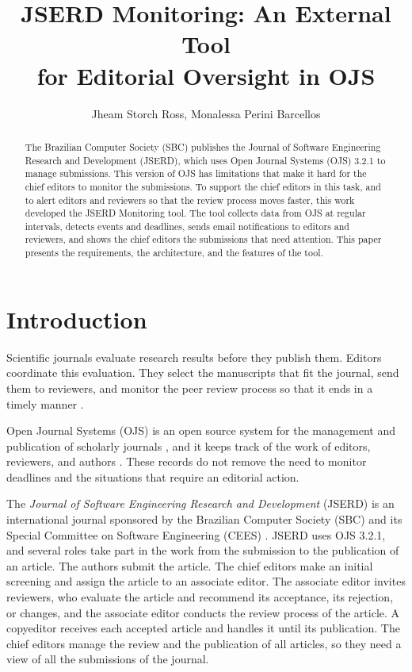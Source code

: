 \documentclass[12pt]{article}
\title{JSERD Monitoring: An External Tool\\for Editorial Oversight in OJS}
\author{Jheam Storch Ross\inst{1}, Monalessa Perini Barcellos\inst{1}}
\begin{document}
\maketitle

\begin{abstract}
The Brazilian Computer Society (SBC) publishes the Journal of Software
Engineering Research and Development (JSERD), which uses Open Journal Systems
(OJS) 3.2.1 to manage submissions. This version of OJS has limitations that make it hard
for the chief editors to monitor the submissions. To support the chief
editors in this task, and to alert editors and reviewers so that the review
process moves faster, this work developed the JSERD Monitoring tool.
The tool collects data from OJS at regular intervals, detects events
and deadlines, sends email notifications to editors and reviewers, and shows
the chief editors the submissions that need attention. This paper presents
the requirements, the architecture, and the features of the tool.
\end{abstract}

\section{Introduction}
\label{sec-introduction}

Scientific journals evaluate research results before they publish them.
Editors coordinate this evaluation. They select the manuscripts that fit the
journal, send them to reviewers, and monitor the peer review process so that
it ends in a timely manner \cite{kelly2014peer}.

Open Journal Systems (OJS) is an open source system for the management and
publication of scholarly journals \cite{willinsky2005ojs}, and it keeps track of
the work of editors, reviewers, and authors \cite{pkpguia}. These records do
not remove the need to monitor deadlines and the situations that require an
editorial action.

The \textit{Journal of Software Engineering Research and Development}
(JSERD) is an international journal sponsored by the Brazilian Computer
Society (SBC) and its Special Committee on Software Engineering (CEES)
\cite{jserd}. JSERD uses OJS 3.2.1, and several roles take part in the work
from the submission to the publication of an article. The authors submit the
article. The chief editors make an initial screening and assign the article
to an associate editor. The associate editor invites reviewers, who evaluate
the article and recommend its acceptance, its rejection, or changes, and the
associate editor conducts the review process of the article. A copyeditor
receives each accepted article and handles it until its publication. The
chief editors manage the review and the publication of all articles, so they
need a view of all the submissions of the journal.
\end{document}
